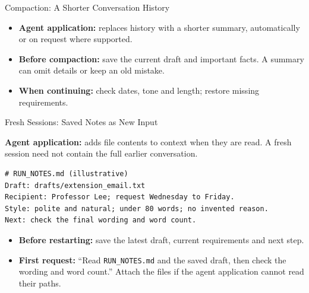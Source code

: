 \begin{frame}{Compaction: A Shorter Conversation History}
\small
{}\par\smallskip
\begin{figure}\centering
{}
\end{figure}
\begin{itemize}
\item \textbf{Agent application:}  replaces history with a shorter summary, automatically or on request where supported.
\item \textbf{Before compaction:} save the current draft and important facts. A summary can omit details or keep an old mistake.
\item \textbf{When continuing:} check dates, tone and length; restore missing requirements.
\end{itemize}
\end{frame}

\begin{frame}[fragile]{Fresh Sessions: Saved Notes as New Input}
\small
{}\par\smallskip
\textbf{Agent application:} adds file contents to context when they are read. A fresh session need not contain the full earlier conversation.
\begin{verbatim}
# RUN_NOTES.md (illustrative)
Draft: drafts/extension_email.txt
Recipient: Professor Lee; request Wednesday to Friday.
Style: polite and natural; under 80 words; no invented reason.
Next: check the final wording and word count.
\end{verbatim}
\begin{itemize}
\item \textbf{Before restarting:} save the latest draft, current requirements and next step.
\item \textbf{First request:} ``Read \texttt{RUN\_NOTES.md} and the saved draft, then check the wording and word count.'' Attach the files if the agent application cannot read their paths.
\end{itemize}
\end{frame}

